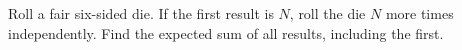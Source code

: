Roll a fair six-sided die. If the first result is $N$, roll the die $N$ more times independently. Find the expected sum of all results, including the first.
